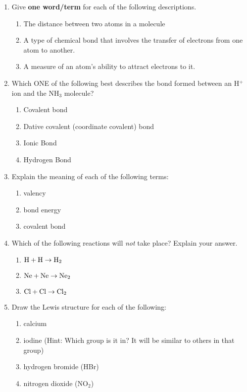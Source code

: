\begin{eocexercises}{}

\begin{enumerate}

\item{Give \textbf{one word/term} for each of the following descriptions.}
	\begin{enumerate}
	\item{The distance between two atoms in a molecule}
	\item{A type of chemical bond that involves the transfer of electrons from one atom to another.}
	\item{A measure of an atom's ability to attract electrons to it.}
	\end{enumerate}

\item{Which ONE of the following best describes the bond formed between an H$^+$ ion and the NH$_3$ molecule?}
		\begin{enumerate}
		\item{Covalent bond}
		\item{Dative covalent (coordinate covalent) bond}
		\item{Ionic Bond}
		\item{Hydrogen Bond}
		\end{enumerate}

\item{Explain the meaning of each of the following terms:}
	\begin{enumerate}
	\item{valency}
	\item{bond energy}
	\item{covalent bond}
	\end{enumerate}

\item{Which of the following reactions will \textit{not} take place? Explain your answer.}
	\begin{enumerate}
	\item{$\rm{H + H \rightarrow H_{2}}$}
	\item{$\rm{Ne + Ne \rightarrow Ne_{2}}$}
	\item{$\rm{Cl + Cl \rightarrow Cl_{2}}$}
	\end{enumerate}

\item{Draw the Lewis structure for each of the following:}
	\begin{enumerate}
	\item{calcium}
	\item{iodine (Hint: Which group is it in? It will be similar to others in that group)}
	\item{hydrogen bromide (HBr)}
	\item{nitrogen dioxide (NO$_{2}$)}
	\end{enumerate}


\end{enumerate}
\end{eocexercises}
